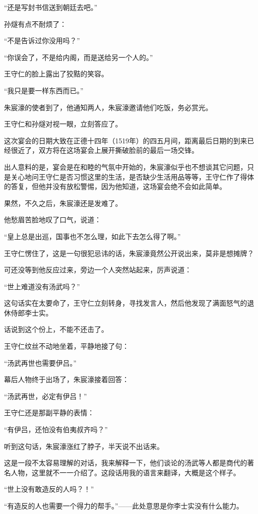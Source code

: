 \begin{multicols}{\theparacolNo}
		“还是写封书信送到朝廷去吧。”

		孙燧有点不耐烦了：

		“不是告诉过你没用吗？”

		“你误会了，不是给内阁，而是送给另一个人的。”

		王守仁的脸上露出了狡黠的笑容。

		“我只是要一样东西而已。”

		朱宸濠的使者到了，他通知两人，朱宸濠邀请他们吃饭，务必赏光。

		王守仁和孙燧对视一眼，立刻答应了。

		这次宴会的日期大致在正德十四年（1519年）的四五月间，距离最后日期的到来已经很近了，双方将在这场宴会上展开撕破脸前的最后一场交锋。

		出人意料的是，宴会是在和睦的气氛中开始的，朱宸濠似乎也不想谈其它问题，只是关心地问王守仁是否习惯这里的生活，是否缺少生活用品等等，王守仁作了得体的答复，但他并没有放松警惕，因为他知道，这场宴会绝不会如此简单。

		果然，不久之后，朱宸濠还是发难了。

		他愁眉苦脸地叹了口气，说道：

		“皇上总是出巡，国事也不怎么理，如此下去怎么得了啊。”

		王守仁愣住了，这是一句很犯忌讳的话，朱宸濠竟然公开说出来，莫非是想摊牌？

		可还没等到他反应过来，旁边一个人突然站起来，厉声说道：

		“世上难道没有汤武吗？”

		这句话实在太要命了，王守仁立刻转身，寻找发言人，然后他发现了满面怒气的退休侍郎李士实。

		话说到这个份上，不能不还击了。

		王守仁纹丝不动地坐着，平静地接了句：

		“汤武再世也需要伊吕。”

		幕后人物终于出场了，朱宸濠接着回答：

		“汤武再世，必定有伊吕！”

		王守仁还是那副平静的表情：

		“有伊吕，还怕没有伯夷叔齐吗？”

		听到这句话，朱宸濠涨红了脖子，半天说不出话来。

		这是一段不太容易理解的对话，我来解释一下，他们谈论的汤武等人都是商代的著名人物，这里就不一一介绍了。这段话用我的语言来翻译，大概是这个样子。

		“世上没有敢造反的人吗？！”

		“有造反的人也需要一个得力的帮手。”——此处意思是你李士实没有什么能力。


\end{multicols}
